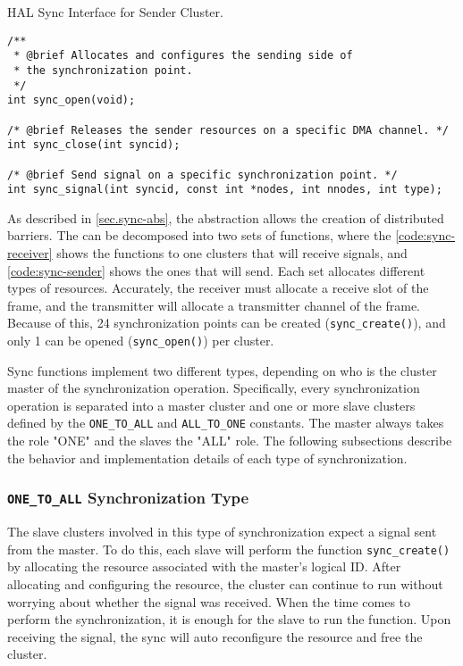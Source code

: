 \begin{listing}[!tb]
\caption{HAL Sync Interface for Sender Cluster.}
\label{code:sync-sender}
\begin{verbatim}
/**
 * @brief Allocates and configures the sending side of
 * the synchronization point.
 */
int sync_open(void);

/* @brief Releases the sender resources on a specific DMA channel. */
int sync_close(int syncid);

/* @brief Send signal on a specific synchronization point. */
int sync_signal(int syncid, const int *nodes, int nnodes, int type);
\end{verbatim}
\end{listing}

				As described in \autoref{sec.sync-abs}, the \sync abstraction allows the
				creation of distributed barriers.
				The \sync can be decomposed into two sets of functions, where the
				\autoref{code:sync-receiver} shows the functions to one clusters
				that will receive signals, and \autoref{code:sync-sender} shows the
				ones that will send.
				Each set allocates different types of resources.
				Accurately, the receiver must allocate a receive slot of the frame,
				and the transmitter will allocate a transmitter channel of the frame.
				Because of this, 24 synchronization points can be created (\texttt{sync\_create()}),
				and only 1 can be opened (\texttt{sync\_open()}) per cluster.

				Sync functions implement two different types, depending on who is the
				cluster master of the synchronization operation.
				Specifically, every synchronization operation is separated into a
				master cluster and one or more slave clusters defined by the
				\texttt{ONE\_TO\_ALL} and \texttt{ALL\_TO\_ONE} constants.
				The master always takes the role "ONE" and the slaves the "ALL" role.
				The following subsections describe the behavior and implementation
				details of each type of synchronization.

				\subsubsection*{\texttt{ONE\_TO\_ALL} Synchronization Type}

					The slave clusters involved in this type of synchronization expect
					a signal sent from the master.
					To do this, each slave will perform the function \texttt{sync\_create()}
					by allocating the resource associated with the master's logical ID.
					After allocating and configuring the resource, the cluster can
					continue to run without worrying about whether the signal was received.
					When the time comes to perform the synchronization, it is enough for
					the slave to run the function.
					Upon receiving the signal, the sync will auto reconfigure the resource
					and free the cluster.

